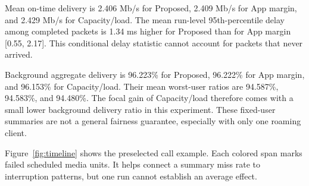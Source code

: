 \documentclass[11pt,a4paper]{article}
\begin{document}
Mean on-time delivery is 2.406 Mb/s for Proposed, 2.409 Mb/s for App margin, and 2.429 Mb/s for Capacity/load. The mean run-level 95th-percentile delay among completed packets is 1.34 ms higher for Proposed than for App margin [0.55, 2.17]. This conditional delay statistic cannot account for packets that never arrived.

Background aggregate delivery is 96.223\% for Proposed, 96.222\% for App margin, and 96.153\% for Capacity/load. Their mean worst-user ratios are 94.587\%, 94.583\%, and 94.480\%. The focal gain of Capacity/load therefore comes with a small lower background delivery ratio in this experiment. These fixed-user summaries are not a general fairness guarantee, especially with only one roaming client.

Figure~\ref{fig:timeline} shows the preselected call example. Each colored span marks failed scheduled media units. It helps connect a summary miss rate to interruption patterns, but one run cannot establish an average effect.
\end{document}
